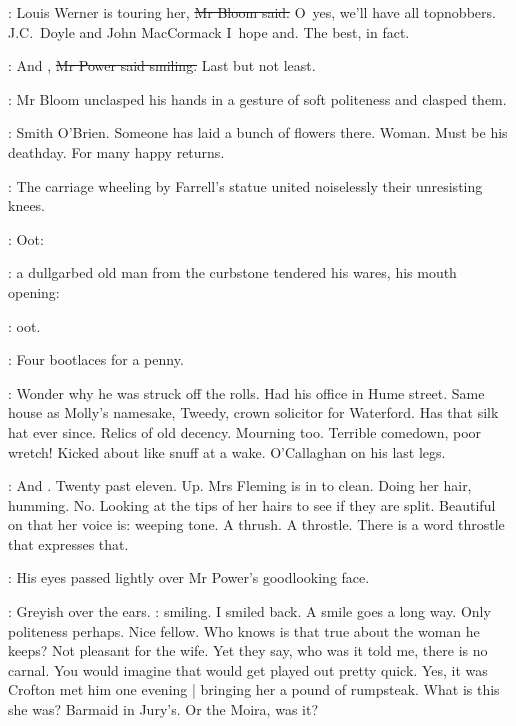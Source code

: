 \Bloom:
Louis Werner is touring her,
\sout{Mr Bloom said.}
O~yes, we'll have all topnobbers.
J.C.~Doyle and John MacCormack I~hope and.
The best, in fact.

\power:
And ,
\sout{Mr Power said smiling.}
Last but not least.

:
Mr Bloom unclasped his hands in a gesture of soft politeness and clasped them.

\BloomInt:
Smith O'Brien.
Someone has laid a bunch of flowers there.
Woman.
Must be his deathday.
For many happy returns.

:
The carriage wheeling by Farrell's statue
united noiselessly their unresisting knees.

\man:
Oot:

:
a dullgarbed old man from the curbstone tendered his wares,
his mouth opening:

\man:
oot.

\man:
Four bootlaces for a penny.

\BloomInt:
Wonder why he was struck off the rolls.
Had his office in Hume street.
Same house as Molly's namesake,
Tweedy, crown solicitor for Waterford.
Has that silk hat ever since.
Relics of old decency.
Mourning too.
Terrible comedown, poor wretch!
Kicked about like snuff at a wake.
O'Callaghan on his last legs.

\BloomInt:
And .
Twenty past eleven.
Up.
Mrs Fleming is in to clean.
Doing her hair, humming.
No.
Looking at the tips of her hairs to see if they are split.
Beautiful on that  her voice is:
weeping tone.
A thrush.
A throstle.
There is a word throstle that expresses that.

:
His eyes passed lightly over Mr Power's goodlooking face.

\BloomInt:
Greyish over the ears.
:
smiling.
I smiled back.
A smile goes a long way.
Only politeness perhaps.
Nice fellow.
Who knows is that true about the woman he keeps?
Not pleasant for the wife.
Yet they say,
who was it told me,
there is no carnal.
You would imagine that would get played out pretty quick.
Yes, it was Crofton met him one evening |
bringing her a pound of rumpsteak.
What is this she was?
Barmaid in Jury's.
Or the Moira, was it?

